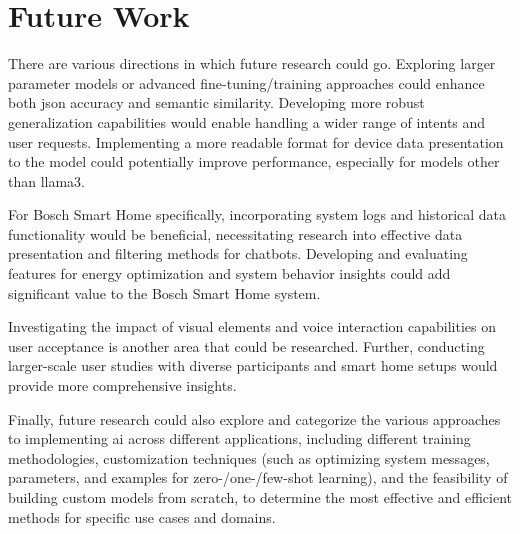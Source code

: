 \section{Future Work}

There are various directions in which future research could go.
Exploring larger parameter models or advanced fine-tuning/training approaches could enhance both \gls{json} accuracy and semantic similarity. 
Developing more robust generalization capabilities would enable handling a wider range of intents and user requests.
Implementing a more readable format for device data presentation to the model could potentially improve performance, especially for models other than llama3. 

For Bosch Smart Home specifically, incorporating system logs and historical data functionality would be beneficial, necessitating research into effective data presentation and filtering methods for chatbots.
Developing and evaluating features for energy optimization and system behavior insights could add significant value to the Bosch Smart Home system.

Investigating the impact of visual elements and voice interaction capabilities on user acceptance is another area that could be researched. 
Further, conducting larger-scale user studies with diverse participants and smart home setups would provide more comprehensive insights. 

Finally, future research could also explore and categorize the various approaches to implementing \gls{ai} across different applications, including different training methodologies, customization techniques (such as optimizing system messages, parameters, and examples for zero-/one-/few-shot learning), and the feasibility of building custom models from scratch, to determine the most effective and efficient methods for specific use cases and domains.